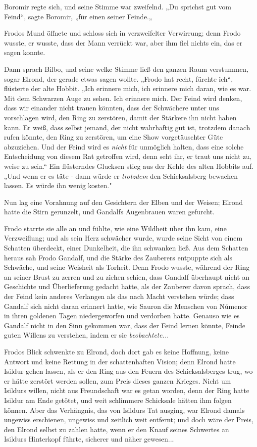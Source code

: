 {Boromir regte sich, und seine Stimme war zweifelnd. „Du sprichst gut vom Feind“, sagte Boromir, „für einen seiner Feinde.„

Frodos Mund öffnete und schloss sich in verzweifelter Verwirrung; denn Frodo wusste, er wusste, dass der Mann verrückt war, aber ihm fiel nichts ein, das er sagen konnte.

Dann sprach Bilbo, und seine welke Stimme ließ den ganzen Raum verstummen, sogar Elrond, der gerade etwas sagen wollte. „Frodo hat recht, fürchte ich“, flüsterte der alte Hobbit. „Ich erinnere mich, ich erinnere mich daran, wie es war. Mit dem Schwarzen Auge zu sehen. Ich erinnere mich. Der Feind wird denken, dass wir einander nicht trauen könnten, dass der Schwächere unter uns vorschlagen wird, den Ring zu zerstören, damit der Stärkere ihn nicht haben kann. Er weiß, dass selbst jemand, der nicht wahrhaftig gut ist, trotzdem danach rufen könnte, den Ring zu zerstören, um eine Show vorgetäuschter Güte abzuziehen. Und der Feind wird es \emph{nicht} für unmöglich halten, dass eine solche Entscheidung von diesem Rat getroffen wird, denn seht ihr, er traut uns nicht zu, weise zu sein.“ Ein flüsterndes Glucksen stieg aus der Kehle des alten Hobbits auf. „Und wenn er es täte - dann würde er \emph{trotzdem} den Schicksalsberg bewachen lassen. Es würde ihn wenig kosten."

Nun lag eine Vorahnung auf den Gesichtern der Elben und der Weisen; Elrond hatte die Stirn gerunzelt, und Gandalfs Augenbrauen waren gefurcht.

Frodo starrte sie alle an und fühlte, wie eine Wildheit über ihn kam, eine Verzweiflung; und als sein Herz schwächer wurde, wurde seine Sicht von einem Schatten überdeckt, einer Dunkelheit, die ihn schwanken ließ. Aus dem Schatten heraus sah Frodo Gandalf, und die Stärke des Zauberers entpuppte sich als Schwäche, und seine Weisheit als Torheit. Denn Frodo wusste, während der Ring an seiner Brust zu zerren und zu ziehen schien, dass Gandalf überhaupt nicht an Geschichte und Überlieferung gedacht hatte, als der Zauberer davon sprach, dass der Feind kein anderes Verlangen als das nach Macht verstehen würde; dass Gandalf sich nicht daran erinnert hatte, wie Sauron die Menschen von Númenor in ihren goldenen Tagen niedergeworfen und verdorben hatte. Genauso wie es Gandalf nicht in den Sinn gekommen war, dass der Feind lernen könnte, Feinde guten Willens zu verstehen, indem er sie \emph{beobachtete}...

Frodos Blick schwenkte zu Elrond, doch dort gab es keine Hoffnung, keine Antwort und keine Rettung in der schattenhaften Vision; denn Elrond hatte Isildur gehen lassen, als er den Ring aus den Feuern des Schicksalsberges trug, wo er hätte zerstört werden sollen, zum Preis dieses ganzen Krieges. Nicht um Isildurs willen, nicht aus Freundschaft war es getan worden, denn der Ring hatte Isildur am Ende getötet, und weit schlimmere Schicksale hätten ihm folgen können. Aber das Verhängnis, das von Isildurs Tat ausging, war Elrond damals ungewiss erschienen, ungewiss und zeitlich weit entfernt; und doch wäre der Preis, den Elrond selbst zu zahlen hatte, wenn er den Knauf seines Schwertes an Isildurs Hinterkopf führte, sicherer und näher gewesen...

}
